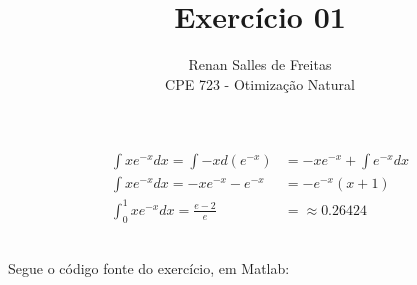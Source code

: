 \documentclass[12pt]{article}
\newenvironment{exercise}[2][Exercício]{\begin{trivlist}
\item[\hskip \labelsep {\bfseries #1}\hskip \labelsep {\bfseries #2.}]}{\end{trivlist}}
\begin{document}
 
 
\title{Exercício 01}
\author{Renan Salles de Freitas\\
CPE 723 - Otimização Natural}
 
\maketitle
 
\begin{exercise}{1.a} 
\begin{align*}
\int xe^{-x} dx = \int -x d(e^{-x}) &= -xe^{-x} + \int e^{-x} dx \\
\int xe^{-x} dx = -xe^{-x} - e^{-x} &= -e^{-x} (x+1)  \\
\int_{0}^{1} xe^{-x} dx = \frac{e-2}{e} &= \approx 0.26424
\end{align*}
\end{exercise}
 
\begin{exercise}{1.b}\\
Segue o código fonte do exercício, em Matlab:
 
\end{exercise}
\end{document}
